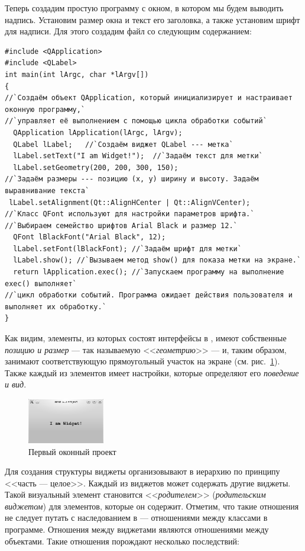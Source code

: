 Теперь создадим простую программу с окном, в котором мы будем выводить надпись. Установим размер окна и текст его
заголовка, а также установим шрифт для надписи. Для этого создадим файл
 со следующим содержанием:
\begin{lstlisting}
#include <QApplication>
#include <QLabel>
int main(int lArgc, char *lArgv[])
{
//`Создаём объект QApplication, который инициализирует и настраивает оконную программу,` 
//`управляет её выполнением с помощью цикла обработки событий`
  QApplication lApplication(lArgc, lArgv);
  QLabel lLabel;   //`Создаём виджет QLabel --- метка`
  lLabel.setText("I am Widget!");  //`Задаём текст для метки`
  lLabel.setGeometry(200, 200, 300, 150);
//`Задаём размеры --- позицию (x, y) ширину и высоту. Задаём выравнивание текста`
 lLabel.setAlignment(Qt::AlignHCenter | Qt::AlignVCenter);
//`Класс QFont используют для настройки параметров шрифта.` 
//`Выбираем семейство шрифтов Arial Black и размер 12.`
  QFont lBlackFont("Arial Black", 12);
  lLabel.setFont(lBlackFont); //`Задаём шрифт для метки`
  lLabel.show(); //`Вызываем метод show() для показа метки на экране.`
  return lApplication.exec(); //`Запускаем программу на выполнение exec() выполняет` 
//`цикл обработки событий. Программа ожидает действия пользователя и выполняет их обработку.`
}
\end{lstlisting}

Как видим, элементы, из которых состоят интерфейсы в , имеют собственные \emph{позицию и размер} --- так называемую <<\emph{геометрию}>> --- и, таким образом, занимают
соответствующую прямоугольный участок на экране (см. рис.~\ref{ch13:refDrawing0}). Также каждый из элементов имеет
настройки, которые определяют его \emph{поведение и вид}.

\begin{figure}[htb]
\begin{center}
\includegraphics[width=0.3\textwidth]{img/ris_13_1}
\caption[Первый оконный проект]{Первый оконный проект}
\label{ch13:refDrawing0}
\end{center}
\end{figure}

Для создания структуры  виджеты организовывают в иерархию по принципу <<часть --- целое>>. Каждый из виджетов может
содержать другие виджеты. Такой  визуальный элемент становится <<\emph{родителем}>> (\emph{родительским виджетом}) для элементов, которые он содержит. Отметим, что такие отношения не следует
путать с наследованием в  --- отношениями между классами в программе. Отношения между виджетами являются отношениями
между объектами. Такие отношения порождают несколько последствий:

